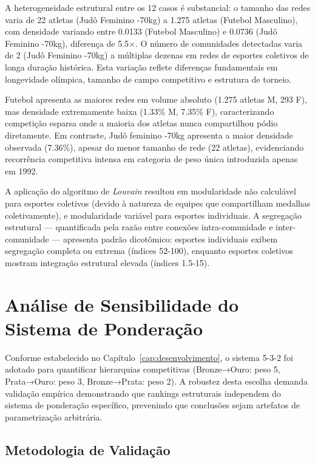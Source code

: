 

A heterogeneidade estrutural entre os 12 casos é substancial: o tamanho das redes varia de 22 atletas (Judô Feminino -70kg) a 1.275 atletas (Futebol Masculino), com densidade variando entre 0.0133 (Futebol Masculino) e 0.0736 (Judô Feminino -70kg), diferença de 5.5×. O número de comunidades detectadas varia de 2 (Judô Feminino -70kg) a múltiplas dezenas em redes de esportes coletivos de longa duração histórica. Esta variação reflete diferenças fundamentais em longevidade olímpica, tamanho de campo competitivo e estrutura de torneio.

Futebol apresenta as maiores redes em volume absoluto (1.275 atletas M, 293 F), mas densidade extremamente baixa (1.33\% M, 7.35\% F), caracterizando competição esparsa onde a maioria dos atletas nunca compartilhou pódio diretamente. Em contraste, Judô feminino -70kg apresenta a maior densidade observada (7.36\%), apesar do menor tamanho de rede (22 atletas), evidenciando recorrência competitiva intensa em categoria de peso única introduzida apenas em 1992.

A aplicação do algoritmo de \textit{Louvain}{} resultou em modularidade não calculável para esportes coletivos (devido à natureza de equipes que compartilham medalhas coletivamente), e modularidade variável para esportes individuais. A segregação estrutural — quantificada pela razão entre conexões intra-comunidade e inter-comunidade — apresenta padrão dicotômico: esportes individuais exibem segregação completa ou extrema (índices 52-100), enquanto esportes coletivos mostram integração estrutural elevada (índices 1.5-15).

\section{Análise de Sensibilidade do Sistema de Ponderação}
\label{sec:weight_sensitivity}

Conforme estabelecido no Capítulo~\ref{cap:desenvolvimento}, o sistema 5-3-2 foi adotado para quantificar hierarquias competitivas (Bronze→Ouro: peso 5, Prata→Ouro: peso 3, Bronze→Prata: peso 2). A robustez desta escolha demanda validação empírica demonstrando que rankings estruturais independem do sistema de ponderação específico, prevenindo que conclusões sejam artefatos de parametrização arbitrária.

\subsection{Metodologia de Validação}

